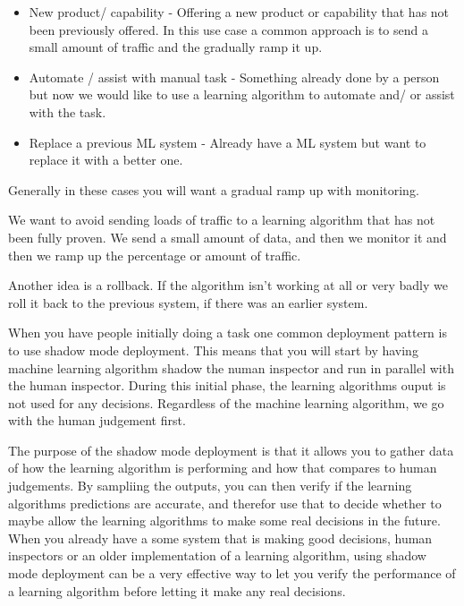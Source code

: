 \begin{itemize}
    \item New product/ capability - Offering a new product or capability that has not been previously offered.
    In this use case a common approach is to send a small amount of traffic and the gradually ramp it up.
    \item Automate / assist with manual task - Something already done by a person but now we would like to use a learning algorithm to automate and/ or assist with the task.
    \item Replace a previous ML system - Already have a ML system but want to replace it with a better one.
\end{itemize}

Generally in these cases you will want a gradual ramp up with monitoring.

We want to avoid sending loads of traffic to a learning algorithm that has not been fully proven.
We send a small amount of data, and then we monitor it and then we ramp up the percentage or amount of traffic.

Another idea is a rollback.
If the algorithm isn't working at all or very badly we roll it back to the previous system, if there was an earlier system.

When you have people initially doing a task one common deployment pattern is to use shadow mode deployment.
This means that you will start by having machine learning algorithm shadow the numan inspector and run in parallel with the human inspector.
During this initial phase, the learning algorithms ouput is not used for any decisions.
Regardless of the machine learning algorithm, we go with the human judgement first.

The purpose of the shadow mode deployment is that it allows you to gather data of how the learning algorithm is performing and how that compares to human judgements.
By sampliing the outputs, you can then verify if the learning algorithms predictions are accurate, and therefor use that to decide whether to maybe allow the learning algorithms to make some real decisions in the future.
When you already have a some system that is making good decisions, human inspectors or an older implementation of a learning algorithm, using shadow mode deployment can be a very effective way to let you verify the performance of a learning algorithm before letting it make any real decisions.



